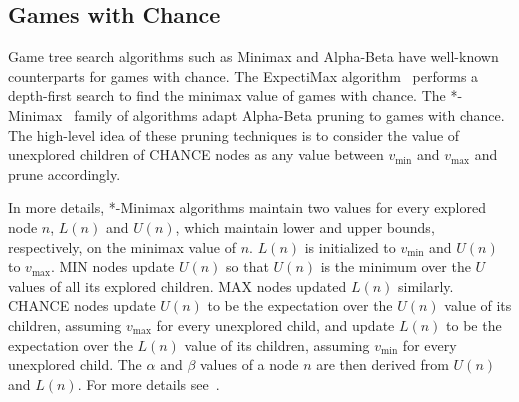 \documentclass[runningheads]{llncs}
\newcommand{\pess}{\mathit{L}}
\newcommand{\opti}{\mathit{U}}
\newcommand{\vmax}{v_{\text{max}}}
\newcommand{\vmin}{v_{\text{min}}}
\begin{document}
\subsection{Games with Chance}
Game tree search algorithms such as Minimax and Alpha-Beta have well-known counterparts for games with chance.
The ExpectiMax algorithm~\citep{michie1966game} performs a depth-first search to find the minimax value of games with chance.
The *-Minimax~\citep{ballard1983minimax} family of algorithms adapt Alpha-Beta pruning to games with chance. The high-level idea of these pruning techniques is to consider the value of unexplored children of CHANCE nodes as any value between $\vmin$ and $\vmax$ and prune accordingly. 

In more details, *-Minimax algorithms maintain two values for every explored node $n$, $\pess(n)$ and $\opti(n)$, which maintain lower and upper bounds, respectively, on the minimax value of $n$. 
$\pess(n)$ is initialized to $\vmin$ and $\opti(n)$ to $\vmax$. 
MIN nodes update $\opti(n)$ so that $\opti(n)$ is the minimum over the $\opti$ values of all its explored children. MAX nodes updated $\pess(n)$ similarly. CHANCE nodes update $\opti(n)$ to be the expectation over the $\opti(n)$ value of its children, assuming $\vmax{}$ for every unexplored child, and update $\pess(n)$ to be the expectation over the $\pess(n)$ value of its children, assuming $\vmin{}$ for every unexplored child. 
The $\alpha$ and $\beta$ values of a node $n$ are then derived from $\opti(n)$ and $\pess(n)$. For more details see~\citep{hauk2004rediscovering}. 

\end{document}
